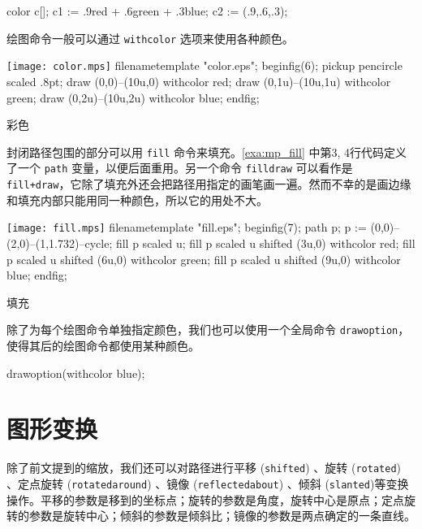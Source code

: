 \begin{Code}[]
color c[];
c1 := .9red + .6green + .3blue;
c2 := (.9,.6,.3);
\end{Code}

绘图命令一般可以通过 \texttt{withcolor} 选项来使用各种颜色。

\begin{example}[htbp]
\begin{FBTDemo}[numbers=left]{\texttt{[image: color.mps]}}
filenametemplate "color.eps";
beginfig(6);
pickup pencircle scaled .8pt;
draw (0,0)--(10u,0) withcolor red;
draw (0,1u)--(10u,1u) withcolor green;
draw (0,2u)--(10u,2u) withcolor blue;
endfig;
\end{FBTDemo}
\caption{\MP 彩色}
\label{exa:mp_color}
\end{example}

封闭路径包围的部分可以用 \texttt{fill} 命令来填充。\autoref{exa:mp_fill} 中第3, 4行代码定义了一个 \texttt{path} 变量，以便后面重用。另一个命令 \texttt{filldraw} 可以看作是 \texttt{fill+draw}，它除了填充外还会把路径用指定的画笔画一遍。然而不幸的是画边缘和填充内部只能用同一种颜色，所以它的用处不大。

\begin{example}[htbp]
\begin{FBTDemo}[numbers=left]{\texttt{[image: fill.mps]}}
filenametemplate "fill.eps";
beginfig(7);
path p;
p := (0,0)--(2,0)--(1,1.732)--cycle;
fill p scaled u;
fill p scaled u shifted (3u,0) withcolor red;
fill p scaled u shifted (6u,0) withcolor green;
fill p scaled u shifted (9u,0) withcolor blue;
endfig;
\end{FBTDemo}
\caption{\MP 填充}
\label{exa:mp_fill}
\end{example}

除了为每个绘图命令单独指定颜色，我们也可以使用一个全局命令 \texttt{drawoption}，使得其后的绘图命令都使用某种颜色。

\begin{Code}[]
drawoption(withcolor blue);
\end{Code}

\section{图形变换}

除了前文提到的缩放，我们还可以对路径进行平移 (\texttt{shifted}) 、旋转 (\texttt{rotated}) 、定点旋转 (\texttt{rotatedaround}) 、镜像 (\texttt{reflectedabout})  、倾斜 (\texttt{slanted})等变换操作。平移的参数是移到的坐标点；旋转的参数是角度，旋转中心是原点；定点旋转的参数是旋转中心；倾斜的参数是倾斜比；镜像的参数是两点确定的一条直线。

